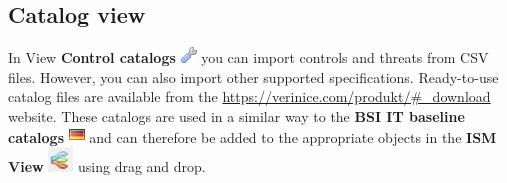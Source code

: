 \documentclass[a4paper,10pt]{book}
\begin{document}
\subsection{Catalog view}
In View \textbf{Control catalogs}
\includegraphics[height=2ex]{Icon/Control_Kataloge.png} you can import controls
and threats from CSV files. However, you can also import other supported
specifications. Ready-to-use catalog files are available from the
\url{https://verinice.com/produkt/#_download} website. These catalogs are used
in a similar way to the \textbf{BSI IT baseline catalogs}
\includegraphics[height=2ex]{Icon/GS_Kataloge.png} and can therefore be added to
the appropriate objects in the \textbf{ISM View}
\includegraphics[height=2ex]{Icon/Informationssicherheitsmodell.png} using drag
and drop.
\end{document}
